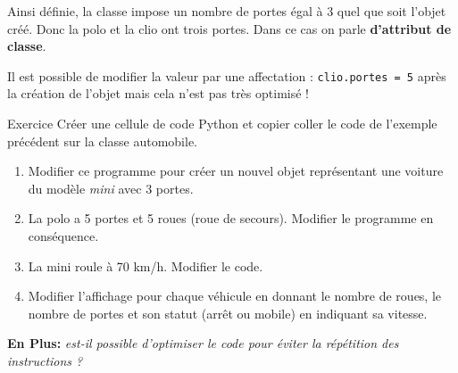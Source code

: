 \documentclass[11pt]{article}
\providecommand{\tightlist}{%
      \setlength{\itemsep}{0pt}\setlength{\parskip}{0pt}}
\begin{document}
Ainsi définie, la classe impose un nombre de portes égal à 3 quel que
soit l'objet créé. Donc la polo et la clio ont trois portes. Dans ce cas
on parle \textbf{d'attribut de classe}.

Il est possible de modifier la valeur par une affectation :
\texttt{clio.portes\ =\ 5} après la création de l'objet mais cela n'est
pas très optimisé !


\begin{exemple}{Exercice}
Créer une cellule de code Python et copier coller le code de l'exemple précédent sur la classe automobile.

\begin{enumerate}
\def\labelenumi{\arabic{enumi}.}
\tightlist
\item
  Modifier ce programme pour créer un nouvel objet représentant une
  voiture du modèle \emph{mini} avec 3 portes.
\item
  La polo a 5 portes et 5 roues (roue de secours). Modifier le programme
  en conséquence.
\item
  La mini roule à 70 km/h. Modifier le code.
\item
  Modifier l'affichage pour chaque véhicule en donnant le nombre de
  roues, le nombre de portes et son statut (arrêt ou mobile) en
  indiquant sa vitesse.
\end{enumerate}

\textbf{En Plus:} \emph{est-il possible d'optimiser le code pour éviter
la répétition des instructions ?}
\end{exemple}
\end{document}
